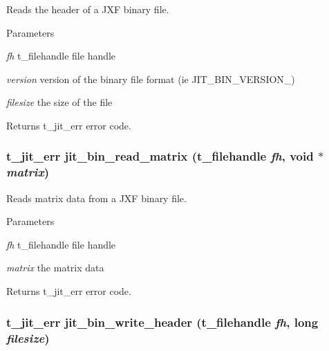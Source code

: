 Reads the header of a JXF binary file. 
\begin{DoxyParams}{Parameters}
\item[{\em fh}]t\_\-filehandle file handle \item[{\em version}]version of the binary file format (ie JIT\_\-BIN\_\-VERSION\_) \item[{\em filesize}]the size of the file\end{DoxyParams}
\begin{DoxyReturn}{Returns}
t\_\-jit\_\-err error code. 
\end{DoxyReturn}
\hypertarget{group__binmod_gae1bd457360f302d87be427c0bcf76b9d}{
\subsubsection[{jit\_\-bin\_\-read\_\-matrix}]{\setlength{\rightskip}{0pt plus 5cm}t\_\-jit\_\-err jit\_\-bin\_\-read\_\-matrix ({\bf t\_\-filehandle} {\em fh}, \/  void $\ast$ {\em matrix})}}
\label{group__binmod_gae1bd457360f302d87be427c0bcf76b9d}


Reads matrix data from a JXF binary file. 
\begin{DoxyParams}{Parameters}
\item[{\em fh}]t\_\-filehandle file handle \item[{\em matrix}]the matrix data\end{DoxyParams}
\begin{DoxyReturn}{Returns}
t\_\-jit\_\-err error code. 
\end{DoxyReturn}
\hypertarget{group__binmod_ga01de67893378a46116aef0fbb36b5b33}{
\subsubsection[{jit\_\-bin\_\-write\_\-header}]{\setlength{\rightskip}{0pt plus 5cm}t\_\-jit\_\-err jit\_\-bin\_\-write\_\-header ({\bf t\_\-filehandle} {\em fh}, \/  long {\em filesize})}}
\label{group__binmod_ga01de67893378a46116aef0fbb36b5b33}


